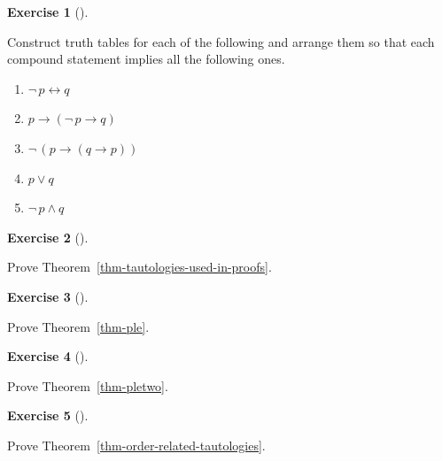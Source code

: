 \documentclass[
  letterpaper,
  10pt,
  reqno,
  twopage,
  openany]{book}
\providecommand{\tightlist}{%
  \setlength{\itemsep}{0pt}\setlength{\parskip}{0pt}}\usepackage{longtable,booktabs,array}
\theoremstyle{plain}
\theoremstyle{definition}
\newtheorem{exercise}{Exercise}[chapter]
\theoremstyle{definition}
\theoremstyle{definition}
\theoremstyle{plain}
\theoremstyle{plain}
\theoremstyle{remark}
\begin{document}
\leavevmode{}%
\begin{exercise}[]\label{exr-1-6}

Construct truth tables for each of the following and arrange them so
that each compound statement implies all the following ones.

\begin{enumerate}
\def\labelenumi{\arabic{enumi}.}
\tightlist
\item
  \(\neg \, p\leftrightarrow q\)
\item
  \(p \rightarrow (\neg \, p\rightarrow q )\)
\item
  \(\neg \, ( p\rightarrow (q\rightarrow p ) )\)
\item
  \(p\lor q\)
\item
  \(\neg \, p \land q\)
\end{enumerate}

\end{exercise}

\leavevmode{}%
\begin{exercise}[]\label{exr-tautologies-used-in-proofs}

Prove Theorem~\ref{thm-tautologies-used-in-proofs}.

\end{exercise}

\leavevmode{}%
\begin{exercise}[]\label{exr-ple}

Prove Theorem~\ref{thm-ple}.

\end{exercise}

\leavevmode{}%
\begin{exercise}[]\label{exr-pletwo}

Prove Theorem~\ref{thm-pletwo}.

\end{exercise}

\leavevmode{}%
\begin{exercise}[]\label{exr-order-related-tautologies}

Prove Theorem~\ref{thm-order-related-tautologies}.

\end{exercise}
\end{document}
